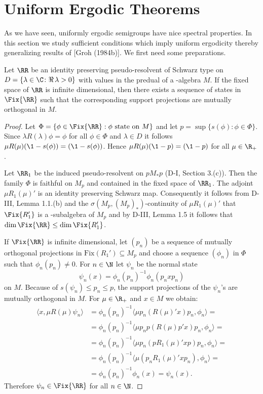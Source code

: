 \section{Uniform Ergodic Theorems}
As we have seen, uniformly ergodic semigroups have nice spectral properties.
In this section we study sufficient conditions which imply uniform ergodicity thereby generalizing results of [Groh (1984b)].
We first need some preparations.
\begin{lemma}\label{lem:d4-4.1}
Let $ \RR $  be an identity preserving pseudo-resolvent of Schwarz type on $ D = \{\lambda \in \C \colon  \Re\,\lambda > 0\} $  with values in the predual of a \WA-algebra $ M $.
If the fixed space of $ \RR $  is infinite dimensional, then there exists a sequence of states in $ \Fix{\RR} $  such that the corresponding support projections are mutually orthogonal in $ M $.
\end{lemma}
\begin{proof}
Let $ \Phi = \{\phi \in \Fix{\RR}: \phi \text{ state on $ M $}\} $  and let $ p = \sup\{s(\phi): \phi \in \Phi\} $.
Since $ \lambda R(\lambda)\phi = \phi $  for all $ \phi \in \Phi $  and $ \lambda \in D $  it follows $ \mu R(\mu)(\1 - s(\phi)) = (\1 - s(\phi)) $.
Hence $ \mu R(\mu)(\1 - p) = (\1 -p ) $  for all $ \mu \in \R_{+} $.

Let $ \RR_{1} $  be the induced pseudo-resolvent on $ pM_{*}p $  (D-I, Section 3.(c)).
Then the family $ \Phi $  is faithful on $ M_{p} $  and contained in the fixed space of $ \RR_{1} $.
The adjoint $ \mu R_{1}(\mu)' $  is an identity preserving Schwarz map.
Consequently it follows from D-III, Lemma 1.1.(b) and the $ \sigma(M_{p},(M_{p})_{*}) $-continuity of $ \mu R_{1}(\mu)' $  that $ \Fix{R_{1}'} $  is a \WA-subalgebra of $ M_{p} $  and by D-III, Lemma 1.5 it follows that $ \dim \Fix{\RR} \leq \dim \Fix{R_{1}'} $.

If $ \Fix{\RR} $  is infinite dimensional, let $ (p_{n}) $  be a sequence of mutually orthogonal projections in $ \text{Fix}(R_{1}') \subseteq M_{p} $  and choose a sequence $ (\phi_{n}) $  in $ \Phi $  such that $ \phi_{n}(p_{n}) \neq 0 $.
For $ n \in \N $  let $ \psi_{n} $  be the normal state
\[
\psi_{n}(x) = \phi_{n}(p_{n})^{-1}\phi_{n}(p_{n}xp_{n})
\]
on $ M $.
Because of $ s(\psi_{n}) \leq p_{n} \leq p $, the support projections of the $ \psi_{n} $'s are mutually orthogonal in $ M $.
For $ \mu \in \R_{+} $  and $ x \in M $  we obtain:
\[
\begin{aligned}
\langle x,\mu R(\mu)\psi_{n}\rangle &= \phi_{n}(p_{n})^{-1}\langle\mu p_{n}(R(\mu)'x)p_{n},\phi_{n}\rangle = \\
&= \phi_{n}(p_{n})^{-1}\langle\mu p_{n}p(R(\mu)p'x)p_{n},\phi_{n}\rangle = \\
&= \phi_{n}(p_{n})^{-1}\langle\mu p_{n}(pR_{1}(\mu)'xp)p_{n},\phi_{n}\rangle = \\
&= \phi_{n}(p_{n})^{-1}\langle\mu(p_{n}R_{1}(\mu)'xp_{n}),\phi_{n}\rangle = \\
&= \phi_{n}(p_{n})^{-1}\phi_{n}(x) = \psi_{n}(x).
\end{aligned}
\]
Therefore $ \psi_{n} \in \Fix{\RR} $  for all $ n \in \N $.
\end{proof}
